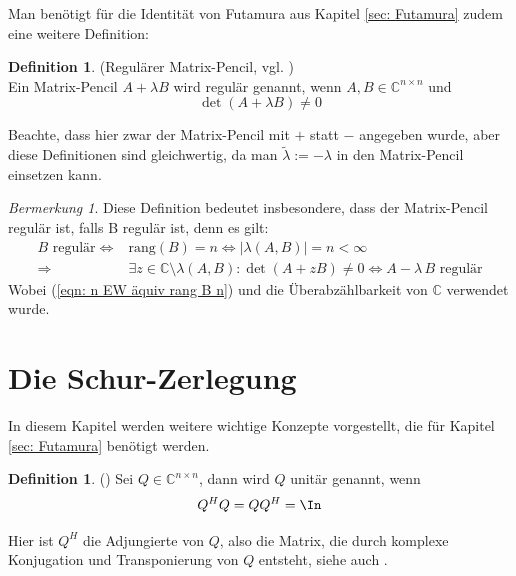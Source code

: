 \documentclass[a4paper,12pt]{report}
\newcommand{\C}{\mathbb C}
\newcommand{\rang}{\text{rang}}
\newcommand{\AlamB}{A-\lambda\,B}
\newcommand{\Cnn}{\C^{n\times n}}
\newcommand{\1}{\mathds{1}}
\theoremstyle{plain} %
\theoremstyle{definition} %
\newtheorem{definition}[theorem]{Definition}
\theoremstyle{remark}
\newtheorem{remark}[theorem]{Bermerkung}
\begin{document}
            Man benötigt für die Identität von Futamura aus Kapitel \ref{sec: Futamura} zudem eine weitere Definition:
            \begin{definition}(Regulärer Matrix-Pencil, vgl. \cite[S. 784]{regularMatrixPencil})\\
                  \label{def: regulärer Pencil}
                  Ein Matrix-Pencil $A+\lambda B$ wird regulär genannt, wenn $A,B\in \Cnn$ und
                  $$\det(A+\lambda B)\ne 0$$ 
            \end{definition}

            Beachte, dass hier zwar der Matrix-Pencil mit $+$ statt $-$ angegeben wurde, aber diese Definitionen sind gleichwertig, da man $\tilde \lambda := -\lambda$ in den Matrix-Pencil einsetzen kann.
            \begin{remark}
                  \label{bem: B reg impl pencil reg}
                  Diese Definition bedeutet insbesondere, dass der Matrix-Pencil regulär ist, falls B regulär ist, denn es gilt:
                  \begin{align*}
                        B\text{ regulär} \Leftrightarrow & \rang(B)=n\Leftrightarrow |\lambda(A,B)| = n<\infty\\
                        \Rightarrow & \exists z\in\C\setminus\lambda(A,B): \det(A+zB) \ne 0 \Leftrightarrow \AlamB \text{ regulär}
                  \end{align*}
                  Wobei (\ref{eqn: n EW äquiv rang B n}) und die Überabzählbarkeit von $\C$ verwendet wurde.
            \end{remark}
            
      \section{Die Schur-Zerlegung}
            In diesem Kapitel werden weitere wichtige Konzepte vorgestellt, die für Kapitel \ref{sec: Futamura} benötigt werden.

            \begin{definition}(\cite[S. 73]{matrixGolub})
                  Sei $Q \in\C^{n\times n}$, dann wird $Q$ unitär genannt, wenn
                  $$Q^HQ = QQ^H=\In$$
            \end{definition}

            Hier ist $Q^H$ die Adjungierte von $Q$, also die Matrix, die durch komplexe Konjugation und Transponierung von $Q$ entsteht, siehe auch \cite[S. 14]{matrixGolub}.
\end{document}

